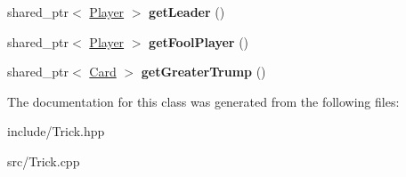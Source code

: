 \begin{DoxyCompactItemize}
\item 
\hypertarget{classTrick_a6cf416941e5dc87aee4b8e38e57a27b2}{shared\-\_\-ptr$<$ \hyperlink{classPlayer}{\-Player} $>$ {\bfseries get\-Leader} ()}\label{classTrick_a6cf416941e5dc87aee4b8e38e57a27b2}

\item 
\hypertarget{classTrick_a8d0441b13d4724c5f4e91b207ffcfce4}{shared\-\_\-ptr$<$ \hyperlink{classPlayer}{\-Player} $>$ {\bfseries get\-Fool\-Player} ()}\label{classTrick_a8d0441b13d4724c5f4e91b207ffcfce4}

\item 
\hypertarget{classTrick_a920da981bd20ca7ce3f8f0965dbb050c}{shared\-\_\-ptr$<$ \hyperlink{classCard}{\-Card} $>$ {\bfseries get\-Greater\-Trump} ()}\label{classTrick_a920da981bd20ca7ce3f8f0965dbb050c}

\end{DoxyCompactItemize}


\-The documentation for this class was generated from the following files\-:\begin{DoxyCompactItemize}
\item 
include/\-Trick.\-hpp\item 
src/\-Trick.\-cpp\end{DoxyCompactItemize}
